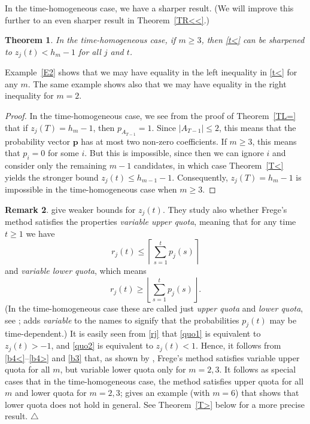 \documentclass[11pt,reqno,tbtags,a4paper]{amsart}
\numberwithin{equation}{section}
\renewcommand\le{\leq}
\renewcommand\ge{\geq}
\renewcommand\leq{\leqslant}
\renewcommand\geq{\geqslant}
\theoremstyle{plain}%
\newtheorem{theorem}{Theorem}[section]
\theoremstyle{definition}
\newcommand\xqed[1]{%
    \leavevmode\unskip\penalty9999 \hbox{}\nobreak\hfill
    \quad\hbox{#1}}
\newtheorem{remarkqqq}[theorem]{Remark}
\newenvironment{remark}{\begin{remarkqqq}}
  {\xqed{$\triangle$}\end{remarkqqq}}
\theoremstyle{remark}
\newcounter{cases}
\newcommand{\refT}[1]{Theorem~\ref{#1}}
\newcommand{\refE}[1]{Example~\ref{#1}}
\newcommand\vp{\mathbf{p}}
\newcommand\0{{\boldsymbol 0}}
\newcommand\1{{\boldsymbol 1}}
\begin{document}
In the time-homogeneous case, we have a sharper result.
(We will improve this further to an even sharper result in \refT{TR<<}.)
\begin{theorem}\label{TR<}
In the time-homogeneous case, if $m\ge3$,
then \eqref{t<} can be sharpened to
$z_j(t)<h_m-1$ for all $j$ and $t$.
\end{theorem}
\refE{E2} shows that we may have equality in the left inequality in
\eqref{t<} for any $m$. The same example shows also that we may have
equality in the right inequality for $m=2$.

\begin{proof}
In the time-homogeneous case, we see from the proof of \refT{TL=} that
if $z_j(T)=h_m-1$, then
$p_{A_{T-1}}=1$.
Since $|A_{T-1}|\le2$, this means that the probability vector $\vp$ has at
most two non-zero coefficients. If $m\ge3$, this means that $p_i=0$ for some
$i$.
But this is impossible, since then we can ignore $i$ and consider only the
remaining $m-1$ candidates, in which case \refT{T<} yields the stronger bound
$z_j(t)\le h_{m-1}-1$.
Consequently,  $z_j(T)=h_m-1$ is impossible in the time-homogeneous case when
$m\ge3$. 
\end{proof}

\begin{remark}
\citet{HLL} give weaker bounds for $z_j(t)$. They study also
whether Frege's method satisfies the  properties
\emph{variable upper quota}, meaning that for any time $t\ge 1$ we have
\begin{equation}\label{quo1}
r_j(t)\le \left \lceil\sum_{s=1}^t p_j(s) \right \rceil
\end{equation}
and 
\emph{variable lower quota}, which means
\begin{equation}\label{quo2}
r_j(t)\ge \left \lfloor \sum_{s=1}^t p_j(s) \right \rfloor.
\end{equation}
(In the time-homogeneous case these are called just
\emph{upper quota} and
\emph{lower quota}, see \cite{BY};
\cite{HLL} adds  \emph{variable} to the names to signify that
the probabilities $p_j(t)$ may be time-dependent.)
It is easily seen from \eqref{rj} that 
\eqref{quo1} is equivalent to $z_j(t)>-1$, and
\eqref{quo2} is equivalent to $z_j(t)<1$.
Hence, it follows from \eqref{b4<}--\eqref{b4>} and \eqref{b3} that, as shown by
\cite{HLL},
Frege's method satisfies variable upper quota for all 
$m$, but variable lower quota only for $m=2,3$.
It follows as special cases that in the time-homogeneous case, the method
satisfies upper quota for all $m$ and lower quota for $m=2,3$;
\cite[Example 5]{HLL} gives an example (with $m=6$)
that shows that lower quota does not hold in general.
See \refT{T>} below for a more precise result.
\end{remark}
\end{document}

